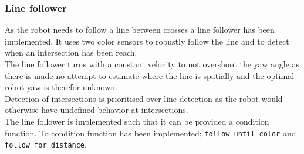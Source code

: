 \documentclass[../../main.tex]{subfiles}
\begin{document}
\subsubsection{Line follower}%
\label{ssub:line_follower}

As the robot needs to follow a line between crosses a line follower has been implemented.
It uses two color sensors to robustly follow the line and to detect
when an intersection has been reach.\\
The line follower turns with a constant velocity to not overshoot the yaw angle as
there is made no attempt to estimate where the line is spatially and the optimal robot
yaw is therefor unknown.\\
Detection of intersections is prioritised over line detection as the robot would otherwise
have undefined behavior at intersections.\\
The line follower is implemented such that it can be provided a condition function.
To condition function has been implemented; \texttt{follow_until_color} and
\texttt{follow_for_distance}.



	
\end{document}
